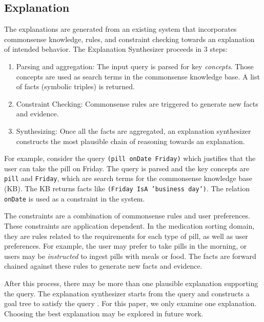 \documentclass[letterpaper]{article}
\begin{document}
\subsection{Explanation}
The explanations are generated from an existing
system \cite{gilpin2018monitoring,leilanithesis} that incorporates commonsense
knowledge, rules, and constraint checking towards an explanation of
intended behavior.  The Explanation Synthesizer proceeds in 3 steps:
\begin{enumerate}
\item Parsing and aggregation: The input query is parsed for key \emph{concepts}.  Those
concepts are used as search terms in the commonsense knowledge base.  A list of facts (symbolic triples) is returned.
\item Constraint Checking: Commonsense rules are triggered to generate
new facts and evidence.
\item Synthesizing: Once all the facts are aggregated, an explanation
synthesizer constructs the most plausible chain of reasoning
towards an explanation.
\end{enumerate}

For example, consider the query \texttt{(pill onDate Friday)} which justifies that the user can take the pill on Friday.  The query is parsed and
the key concepts are \texttt{pill} and \texttt{Friday}, which are search terms for
the commonsense knowledge base (KB).  The KB returns facts like
\texttt{(Friday IsA 'business day')}.  The relation \texttt{onDate} is
used as a constraint in the system.

The constraints are a combination of commonsense rules and user
preferences.  These constraints are application dependent.   In the
medication sorting domain, they are rules related to the requirements
for each type of pill, as well as user preferences.  For example, the
user may prefer to take pills in the morning, or users may be
\emph{instructed} to ingest pills with meals or food.  The facts are
forward chained against these rules to generate new facts and
evidence.

After this process, there may be more than one plausible explanation
supporting the query.  The explanation synthesizer starts from the
query and constructs a goal tree to satisfy the query
\cite{leilanithesis}.  For this paper, we only examine one
explanation.  Choosing the best explanation may be explored in future
work.
\end{document}
